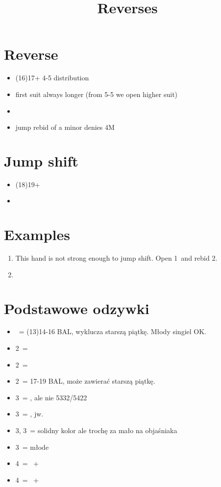 \documentclass[12pt, a4paper]{article}
\title{Reverses}
\date{}
\begin{document}
\maketitle

\section{Reverse}
\begin{itemize}
    \item (16)17+ 4-5 distribution
    \item first suit always longer (from 5-5 we open higher suit)
    \item \fonce
    \item jump rebid of a minor denies 4M \vimp
\end{itemize}

\section{Jump shift}
\begin{itemize}
    \item (18)19+
    \item \gf
\end{itemize}

\section{Examples}

\begin{enumerate}
    \item {}
    This hand is not strong enough to jump shift. Open 1\diams\ and rebid 2\clubs.
    \item 
\end{enumerate}





\section{Podstawowe odzywki}
\begin{itemize}
    \item \dbl\ = (13)14-16 BAL, wyklucza starszą piątkę. Młody singiel OK. \vimp
    \item 2\hearts\ = \hearts
    \item 2\spades\ = \spades
    \item 2\nt\ = 17-19 BAL, może zawierać starszą piątkę. \imp \br
    \item 3\clubs\ = \clubs, ale nie 5332/5422
    \item 3\diams\ = \diams, jw.
    \item 3\hearts, 3\spades\ = solidny kolor ale trochę za mało na objaśniaka
    \item 3\nt\ = młode \vimp
    \item 4\clubs\ = \clubs\ + \hearts\spades
    \item 4\diams\ = \diams\ + \hearts\spades
\end{itemize}
\end{document}
